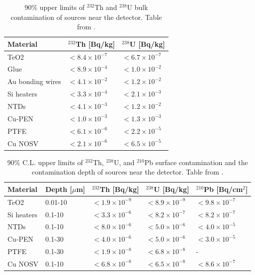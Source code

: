 \begin{table}[htbp]
\centering
\caption[90\% C.L. upper limits of $^{232}$Th and $^{238}$U bulk contamination of sources near the detector]
{90\% upper limits of $^{232}$Th and $^{238}$U bulk contamination of sources near the detector.
Table from \cite{Alduino:2017qet}.}
\label{tab:NearDetectorSources_Bulk}
\begin{tabular}{lll}
\hline
\hline
Material         & $^{232}$Th [Bq/kg]         & $^{238}$U [Bq/kg]    \\
\hline
TeO2             & $<8.4\times10^{-7}$ & $<6.7\times10^{-7}$      \\
Glue             & $<8.9\times10^{-4}$ & $<1.0\times10^{-2}$          \\
Au bonding wires & $<4.1\times10^{-2}$ & $<1.2\times10^{-2}$       \\
Si heaters       & $<3.3\times10^{-4}$ & $<2.1\times10^{-3}$        \\
NTDs             & $<4.1\times10^{-3}$ & $<1.2\times10^{-2}$    \\
Cu-PEN           & $<1.0\times10^{-3}$ & $<1.3\times10^{-3}$ \\
PTFE             & $<6.1\times10^{-6}$ & $<2.2\times10^{-5}$       \\
Cu NOSV           & $<2.1\times10^{-6}$ & $<6.5\times10^{-5}$    \\
\hline
\hline
\end{tabular}
\end{table}

\begin{table}[htbp]
\centering
\caption[90\% C.L. upper limits of $^{232}$Th, $^{238}$U, and $^{210}$Pb surface contamination and the contamination depth of sources near the detector]
{90\% C.L. upper limits of $^{232}$Th, $^{238}$U, and $^{210}$Pb surface contamination and the contamination depth of sources near the detector.
Table from \cite{Alduino:2017qet}.}
\label{tab:NearDetectorSources_Surface}
\begin{tabular}{lllll}
\hline
\hline
Material         & Depth [$\mu$m] & $^{232}$Th [Bq/kg]         & $^{238}$U [Bq/kg]     & $^{210}$Pb [Bq/cm$^2$] \\
\hline
TeO2  & 0.01-10 & $<1.9\times10^{-9}$ & $<8.9\times10^{-9}$ & $<9.8\times10^{-7}$ \\
Si heaters  & 0.1-10 & $<3.3\times10^{-6}$ & $<8.2\times10^{-7}$ & $<8.2\times10^{-7}$ \\
NTDs  & 0.1-10 & $<8.0\times10^{-6}$ & $<5.0\times10^{-6}$ & $<4.0\times10^{-5}$ \\
Cu-PEN  & 0.1-30 & $<4.0\times10^{-6}$ & $<5.0\times10^{-6}$ & $<3.0\times10^{-5}$ \\
PTFE  & 0.1-30 & $<1.9\times10^{-8}$ & $<6.8\times10^{-8}$ & - \\
Cu NOSV & 0.1-10 & $<6.8\times10^{-8}$ & $<6.5\times10^{-8}$ & $<8.6\times10^{-7}$ \\
\hline
\hline
\end{tabular}
\end{table}

